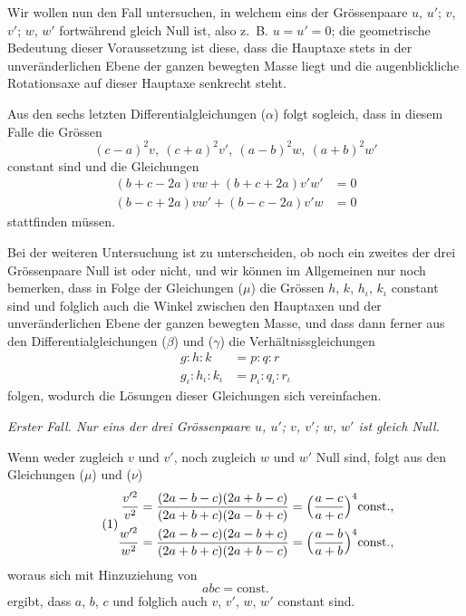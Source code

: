 \documentclass[12pt,a4paper]{book}
\theoremstyle{definition}
\theoremstyle{remark}
\begin{document}
Wir wollen nun den Fall untersuchen, in welchem eins der Grössenpaare $u$, $u'$; $v$, $v'$; $w$, $w'$ fortwährend gleich Null ist, also z.~B. $u = u' = 0$; die geometrische Bedeutung dieser Voraussetzung ist diese, dass die Hauptaxe stets in der unveränderlichen Ebene der ganzen bewegten Masse liegt und die augenblickliche Rotationsaxe auf dieser Hauptaxe senkrecht steht.

Aus den sechs letzten Differentialgleichungen ($\alpha$) folgt sogleich, dass in diesem Falle die Grössen
\begin{equation}
\tag{$\mu$} (c-a)^2v,\ (c+a)^2v',\ (a-b)^2w,\ (a+b)^2w' \end{equation}
constant sind und die Gleichungen
\begin{equation}
\tag{$\nu$}
\begin{aligned} (b+c-2a)vw + (b+c+2a)v'w' &= 0\\ (b-c+2a)vw' + (b-c-2a)v'w &= 0 \end{aligned}
\end{equation}
stattfinden müssen.

Bei der weiteren Untersuchung ist zu unterscheiden, ob noch ein zweites der drei Grössenpaare Null ist oder nicht, und wir können im Allgemeinen nur noch bemerken, dass in Folge der Gleichungen ($\mu$) die Grössen $h$, $k$, $h_\iota$, $k_\iota$ constant sind und folglich auch die Winkel zwischen den Hauptaxen und der unveränderlichen Ebene der ganzen bewegten Masse, und dass dann ferner aus den Differentialgleichungen ($\beta$) und ($\gamma$) die Verhältnissgleichungen
\begin{align*} g : h : k &= p : q : r\\ g_\iota : h_\iota : k_\iota &= p_\iota : q_\iota : r_\iota \end{align*}
folgen, wodurch die Lösungen dieser Gleichungen sich vereinfachen.

\textit{Erster Fall. Nur eins der drei Grössenpaare $u$, $u'$; $v$, $v'$; $w$, $w'$ ist gleich Null.}

Wenn weder zugleich $v$ und $v'$, noch zugleich $w$ und $w'$ Null sind, folgt aus den Gleichungen ($\mu$) und ($\nu$)
\begin{equation}
\tag{1}
\begin{aligned} \frac{v'^2}{v^2} &= \frac{(2a-b-c)(2a+b-c)}{(2a+b+c)(2a-b+c)} = \Bigl(\frac{a-c}{a+c}\Bigr)^4\text{const.,}\\ \frac{w'^2}{w^2} &= \frac{(2a-b-c)(2a-b+c)}{(2a+b+c)(2a+b-c)} = \Bigl(\frac{a-b}{a+b}\Bigr)^4\text{const.,} \end{aligned}
\end{equation}
woraus sich mit Hinzuziehung von
\[ abc = \text{const.} \]
ergibt, dass $a$, $b$, $c$ und folglich auch $v$, $v'$, $w$, $w'$ constant sind.
\end{document}
